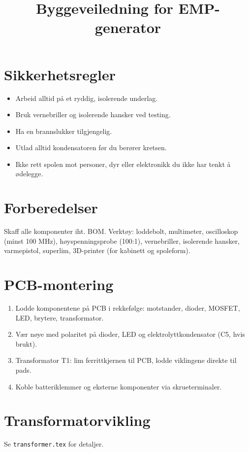 \documentclass{article}
\title{Byggeveiledning for EMP-generator}
\author{}
\date{}
\begin{document}
\maketitle

\section{Sikkerhetsregler}
\begin{itemize}
\item Arbeid alltid på et ryddig, isolerende underlag.
\item Bruk vernebriller og isolerende hansker ved testing.
\item Ha en brannslukker tilgjengelig.
\item Utlad alltid kondensatoren før du berører kretsen.
\item Ikke rett spolen mot personer, dyr eller elektronikk du ikke har tenkt å ødelegge.
\end{itemize}

\section{Forberedelser}
Skaff alle komponenter iht. BOM. Verktøy: loddebolt, multimeter, oscilloskop (minst 100 MHz), høyspenningsprobe (100:1), vernebriller, isolerende hansker, varmepistol, superlim, 3D-printer (for kabinett og spoleform).

\section{PCB-montering}
\begin{enumerate}
\item Lodde komponentene på PCB i rekkefølge: motstander, dioder, MOSFET, LED, brytere, transformator.
\item Vær nøye med polaritet på dioder, LED og elektrolyttkondensator (C5, hvis brukt).
\item Transformator T1: lim ferrittkjernen til PCB, lodde viklingene direkte til pads.
\item Koble batteriklemmer og eksterne komponenter via skrueterminaler.
\end{enumerate}

\section{Transformatorvikling}
Se \texttt{transformer.tex} for detaljer.
\end{document}
